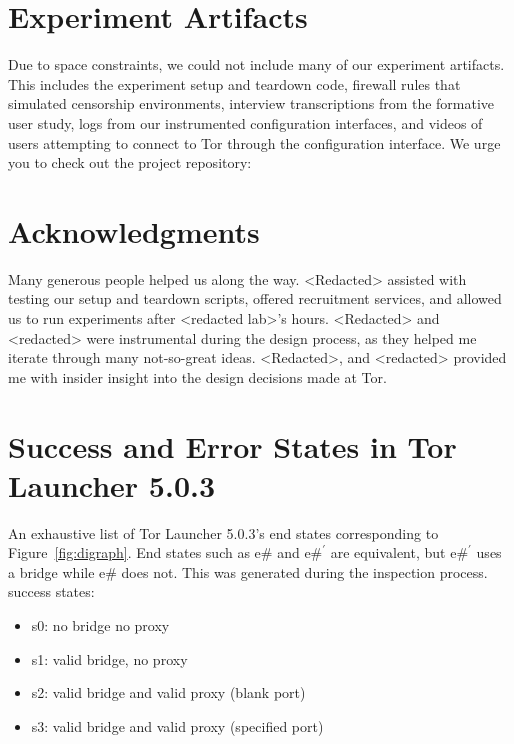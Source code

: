 \documentclass[USenglish,oneside,twocolumn]{article}
\begin{document}
\section {Experiment Artifacts} 
Due to space constraints, we could not include many of our experiment artifacts. This includes the experiment setup and teardown code, firewall rules that simulated censorship environments, interview transcriptions from the formative user study, logs from our instrumented configuration interfaces, and videos of users attempting to connect to Tor through the configuration interface. We urge you to check out the project repository: \\


\section {Acknowledgments}
Many generous people helped us along the way. <Redacted> assisted with testing our setup and teardown scripts, offered recruitment services, and allowed us to run experiments after <redacted lab>'s hours. <Redacted> and <redacted> were instrumental during the design process, as they helped me iterate through many not-so-great ideas.  <Redacted>, and <redacted> provided me with insider insight into the design decisions made at Tor.




\appendix

\section{Success and Error States in Tor Launcher 5.0.3} 
\label{states} 
An exhaustive list of Tor Launcher 5.0.3's end states corresponding to Figure~\ref{fig:digraph}. End states such as e\# and $\mbox{e\#}^\prime$ are equivalent, but $\mbox{e\#}^\prime$ uses a bridge while e\# does not. This was generated during the inspection process.\\

\noindent success states: 
\begin{itemize}
\item s0: no bridge no proxy
\item s1: valid bridge, no proxy
\item s2: valid bridge and valid proxy (blank port)
\item s3: valid bridge and valid proxy (specified port)
\end{itemize}
\end{document}
